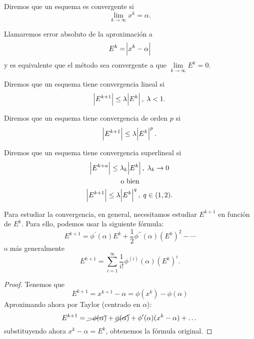 \begin{defi}
    Diremos que un esquema es convergente si
    \[
        \lim_{k \to \infty} x^k = \alpha.
    \]
\end{defi}

\begin{defi}
    Llamaremos error absoluto de la aproximación a 
    \[
        E^k = \abs{x^k - \alpha}
    \]
    y es equivalente que el método sea convergente a que $\lim\limits_{k \to \infty} E^k = 0$.
\end{defi}

\begin{defi}
    Diremos que un esquema tiene convergencia lineal si
    \[
        \abs{E^{k+1}} \leq \lambda \abs{E^k}, \; \lambda < 1.
    \]
\end{defi}

\begin{defi}
    Diremos que un esquema tiene convergencia de orden $p$ si
    \[
        \abs{E^{k+1}} \leq \lambda \abs{E^k}^p.
    \]
\end{defi}

\begin{defi}
    Diremos que un esquema tiene convergencia superlineal si
    \begin{gather*}
        \abs{E^{k+a}} \leq \lambda_k \abs{E^k}, \; \lambda_k \to 0 \\
        \text{o bien} \\
        \abs{E^{k+1}} \leq \lambda \abs{E^k}^q, \; q \in (1, 2).
    \end{gather*}
\end{defi}

\begin{prop}
    Para estudiar la convergencia, en general, necesitamos estudiar $E^{k+1}$ en función de $E^k$.
    Para ello, podemos usar la siguiente fórmula:
    \[
        E^{k+1} = \phi^\prime(\alpha)E^k + \frac{1}{2} \phi^{\prime \prime}(\alpha)\left( E^k \right)^2 - \cdots
    \]
    o más generalmente
    \[
        E^{k+1} = \sum^{\infty}_{i = 1} \frac{1}{i!} \phi^{(i)}(\alpha) \left( E^k \right)^i.
    \]
\end{prop}

\begin{proof}
    Tenemos que
    \[
        E^{k+1} = x^{k+1} - \alpha = \phi(x^k) - \phi(\alpha)
    \]
    Aproximando ahora por Taylor (centrado en $\alpha$):
    \[
        E^{k+1} = \cancel{-\phi(\alpha)} + \cancel{\phi(\alpha)} + \phi^\prime(\alpha)(x^k - \alpha) + \dots
    \]
    substituyendo ahora $x^k - \alpha = E^k$, obtenemos la fórmula original.
\end{proof}

